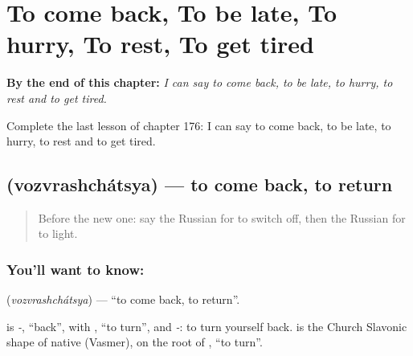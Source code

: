 
\chapter{To come back, To be late, To hurry, To rest, To get tired}
\label{ch:ru-to-come-back-to-be-late-to-hurry-to-rest-to-get-tired}

\begin{chapteropening}
\textbf{By the end of this chapter:} \emph{I can say to come back, to be late, to hurry, to rest and to get tired.}

Complete the last lesson of chapter 176: I can say to come back, to be late, to hurry, to rest and to get tired.
\end{chapteropening}

\section[\texorpdfstring{\ru{возвращаться} (vozvrashchátsya)}{возвращаться (vozvrashchátsya)}]{ (vozvrashchátsya) — to come back, to return}

\label{lesson:RU-C176-vozvrashchatsya}



\begin{quote}
Before the new one: say the Russian for to switch off, then the Russian for to light.
\end{quote}

\subsection*{You'll want to know: }
\textbf{} (\emph{vozvrashchátsya}) — \textquotedblleft{}to come back, to return\textquotedblright{}.

\begin{cousinweb}
\textbf{} is \emph{-}, \textquotedblleft{}back\textquotedblright{}, with \emph{}, \textquotedblleft{}to turn\textquotedblright{}, and \emph{-}: to turn yourself back. \emph{} is the Church Slavonic shape of native \emph{} (Vasmer), on the root of \emph{}, \textquotedblleft{}to turn\textquotedblright{}.
\end{cousinweb}

